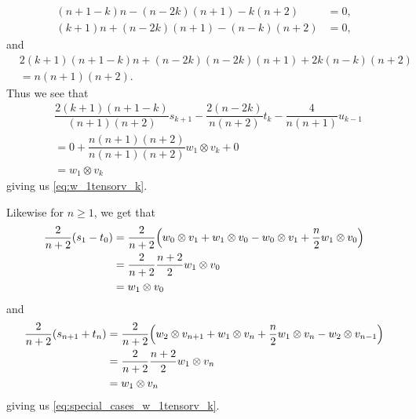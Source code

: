 \begin{align*}
  (n+1-k)n-(n-2k)(n+1)-k(n+2) &= 0, \\
  (k+1)n+(n-2k)(n+1)-(n-k)(n+2) &= 0,
\end{align*}
and
\begin{align*}
  &2(k+1)(n+1-k)n + (n-2k)(n-2k)(n+1)+2k(n-k)(n+2) \\
  &= n(n+1)(n+2).
\end{align*}
Thus we see that
\begin{align*}
  &\dfrac{2(k+1)(n+1-k)}{(n+1)(n+2)}s_{k+1} - \dfrac{2(n-2k)}{n(n+2)}t_k - \dfrac{4}{n(n+1)}u_{k-1}\\
  &= 0 + \dfrac{n(n+1)(n+2)}{n(n+1)(n+2)}w_1\otimes v_k + 0 \\
  &= w_1\otimes v_k
\end{align*}
giving us \cref{eq:w_1tensorv_k}. 

Likewise for $n\geq 1$, we get that
\begin{align*}
  \dfrac{2}{n+2}(s_1-t_0) &= \dfrac{2}{n+2}\Bigl( w_0\otimes v_1 + w_1\otimes v_0 - w_0\otimes v_1 + \dfrac{n}{2}w_1\otimes v_0 \Bigr) \\
  &= \dfrac{2}{n+2}\dfrac{n+2}{2}w_1\otimes v_0 \\
  &= w_1\otimes v_0
\end{align*}
and
\begin{align*}
  \dfrac{2}{n+2}(s_{n+1}+t_n) &= \dfrac{2}{n+2}\Bigl( w_2\otimes v_{n+1} + w_1\otimes v_n + \dfrac{n}{2}w_1\otimes v_n - w_2\otimes v_{n-1} \Bigr)\\
                              &= \dfrac{2}{n+2}\dfrac{n+2}{2} w_1\otimes v_n \\
  &= w_1\otimes v_n
\end{align*}
giving us \cref{eq:special_cases_w_1tensorv_k}.
